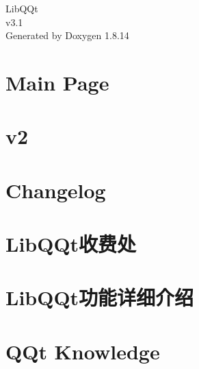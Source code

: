 \documentclass[twoside]{book}
\newcommand{\+}{\discretionary{\mbox{\scriptsize$\hookleftarrow$}}{}{}}
\newcommand{\clearemptydoublepage}{%
  \newpage{\pagestyle{empty}\cleardoublepage}%
}
\begin{document}
\hypersetup{pageanchor=false,
             bookmarksnumbered=true,
             pdfencoding=unicode
            }
\begin{titlepage}
\vspace*{7cm}
\begin{center}%
{\Large Lib\+Q\+Qt \\[1ex]\large v3.\+1 }\\
\vspace*{1cm}
{\large Generated by Doxygen 1.8.14}\\
\end{center}
\end{titlepage}
\clearemptydoublepage
{}
\tableofcontents
\clearemptydoublepage
{}
\hypersetup{pageanchor=true}

\chapter{Main Page}
\label{index}\hypertarget{index}{}
\chapter{v2}
\label{md__r_1__develop_a0-develop__lib_q_qt_changelog_v2_82_81}

\chapter{Changelog}
\label{md__r_1__develop_a0-develop__lib_q_qt_changelog}

\chapter{Lib\+Q\+Qt收费处}
\label{md__r_1__develop_a0-develop__lib_q_qt_charge}

\chapter{Lib\+Q\+Qt功能详细介绍}
\label{md__r_1__develop_a0-develop__lib_q_qt_content}

\chapter{Q\+Qt Knowledge}
\label{md__r_1__develop_a0-develop__lib_q_qt_doc_knowledge-about-lib_q_qt}

\end{document}
